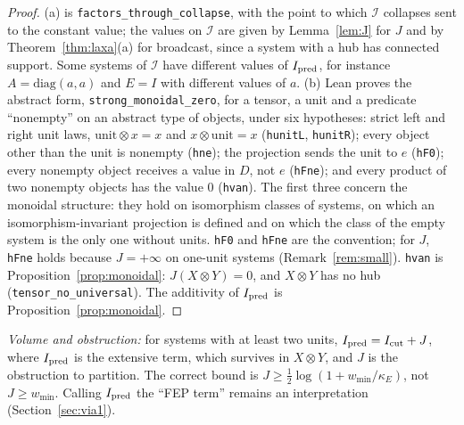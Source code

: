\begin{proof}
(a) is \texttt{factors\_through\_collapse}, with the point to which $\mathcal I$ collapses sent to the constant value; the values on $\mathcal I$ are given by Lemma~\ref{lem:J} for $J$ and by Theorem~\ref{thm:laxa}(a) for broadcast, since a system with a hub has connected support. Some systems of $\mathcal I$ have different values of $I_{\rm pred}$, for instance $A=\mathrm{diag}(a,a)$ and $E=I$ with different values of $a$. (b) Lean proves the abstract form, \texttt{strong\_monoidal\_zero}, for a tensor, a unit and a predicate ``nonempty'' on an abstract type of objects, under six hypotheses: strict left and right unit laws, $\mathrm{unit}\otimes x=x$ and $x\otimes\mathrm{unit}=x$ (\texttt{hunitL}, \texttt{hunitR}); every object other than the unit is nonempty (\texttt{hne}); the projection sends the unit to $e$ (\texttt{hF0}); every nonempty object receives a value in $D$, not $e$ (\texttt{hFne}); and every product of two nonempty objects has the value $0$ (\texttt{hvan}). The first three concern the monoidal structure: they hold on isomorphism classes of systems, on which an isomorphism-invariant projection is defined and on which the class of the empty system is the only one without units. \texttt{hF0} and \texttt{hFne} are the convention; for $J$, \texttt{hFne} holds because $J=+\infty$ on one-unit systems (Remark~\ref{rem:small}). \texttt{hvan} is Proposition~\ref{prop:monoidal}: $J(X\otimes Y)=0$, and $X\otimes Y$ has no hub (\texttt{tensor\_no\_universal}). The additivity of $I_{\rm pred}$ is Proposition~\ref{prop:monoidal}.
\end{proof}
\emph{Volume and obstruction:} for systems with at least two units, $I_{\rm pred}=I_{\rm cut}+J$, where $I_{\rm pred}$ is the extensive term, which survives in $X\otimes Y$, and $J$ is the obstruction to partition. The correct bound is $J\ge\tfrac12\log(1+w_{\min}/\kappa_E)$, not $J\ge w_{\min}$. Calling $I_{\rm pred}$ the ``FEP term'' remains an interpretation (Section~\ref{sec:via1}).


